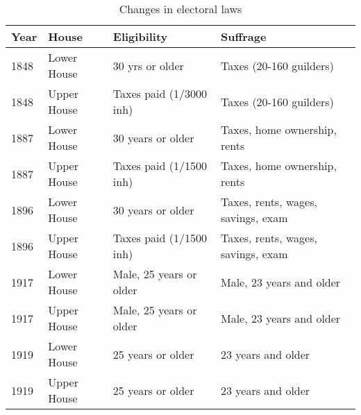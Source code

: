 \begin{table}[!ht]
    \footnotesize
    \centering
    \begin{tabular}{llll}
        Year & House & Eligibility & Suffrage  \\ \hline
        1848 & Lower House & 30 yrs or older & Taxes (20-160 guilders) \\
        1848 & Upper House & Taxes paid (1/3000 inh) & Taxes (20-160 guilders) \\
        1887 & Lower House & 30 years or older & Taxes, home ownership, rents \\
        1887 & Upper House & Taxes paid (1/1500 inh) & Taxes, home ownership, rents \\
        1896 & Lower House & 30 years or older & Taxes, rents, wages, savings, exam \\
        1896 & Upper House & Taxes paid (1/1500 inh) & Taxes, rents, wages, savings, exam \\
        1917 & Lower House & Male, 25 years or older & Male, 23 years and older \\
        1917 & Upper House & Male, 25 years or older  & Male, 23 years and older \\
        1919 & Lower House & 25 years or older & 23 years and older \\
        1919 & Upper House & 25 years or older & 23 years and older \\ \hline
    \end{tabular}
    \caption{Changes in electoral laws}
    \label{tab:upperhouselowerhouse}
\end{table}